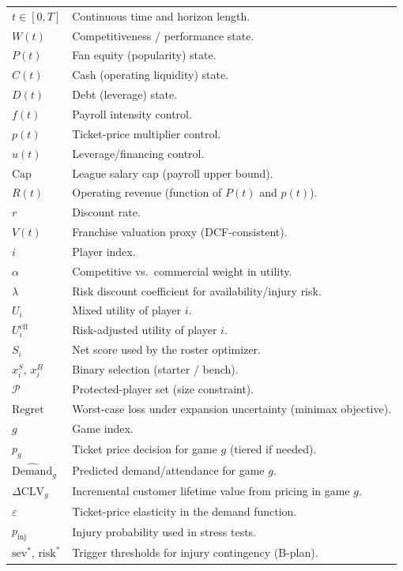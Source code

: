\documentclass[12pt]{article}
\numberwithin{figure}{section}
\numberwithin{table}{section}
\begin{document}
\begin{small}
\begin{longtable}{>{\centering\arraybackslash}p{} >{\raggedright\arraybackslash}p{}}
		$t\in[0,T]$ & Continuous time and horizon length.\\
		$W(t)$ & Competitiveness / performance state.\\
		$P(t)$ & Fan equity (popularity) state.\\
		$C(t)$ & Cash (operating liquidity) state.\\
		$D(t)$ & Debt (leverage) state.\\
		$f(t)$ & Payroll intensity control.\\
		$p(t)$ & Ticket-price multiplier control.\\
		$u(t)$ & Leverage/financing control.\\
		$\mathrm{Cap}$ & League salary cap (payroll upper bound).\\
		$R(t)$ & Operating revenue (function of $P(t)$ and $p(t)$).\\
		$r$ & Discount rate.\\
		$V(t)$ & Franchise valuation proxy (DCF-consistent).\\
		$i$ & Player index.\\
		$\alpha$ & Competitive vs.\ commercial weight in utility.\\
		$\lambda$ & Risk discount coefficient for availability/injury risk.\\
		$U_i$ & Mixed utility of player $i$.\\
		$U_i^{\mathrm{eff}}$ & Risk-adjusted utility of player $i$.\\
		$S_i$ & Net score used by the roster optimizer.\\
		$x_i^{S},\,x_i^{B}$ & Binary selection (starter / bench).\\
		$\mathcal{P}$ & Protected-player set (size constraint).\\
		$\mathrm{Regret}$ & Worst-case loss under expansion uncertainty (minimax objective).\\
		$g$ & Game index.\\
		$p_g$ & Ticket price decision for game $g$ (tiered if needed).\\
		$\widehat{\mathrm{Demand}}_g$ & Predicted demand/attendance for game $g$.\\
		$\Delta \mathrm{CLV}_g$ & Incremental customer lifetime value from pricing in game $g$.\\
		$\varepsilon$ & Ticket-price elasticity in the demand function.\\
		$p_{\mathrm{inj}}$ & Injury probability used in stress tests.\\
		$\text{sev}^*,\,\text{risk}^*$ & Trigger thresholds for injury contingency (B-plan).\\
		
	\end{longtable}
\end{small}
\end{document}
